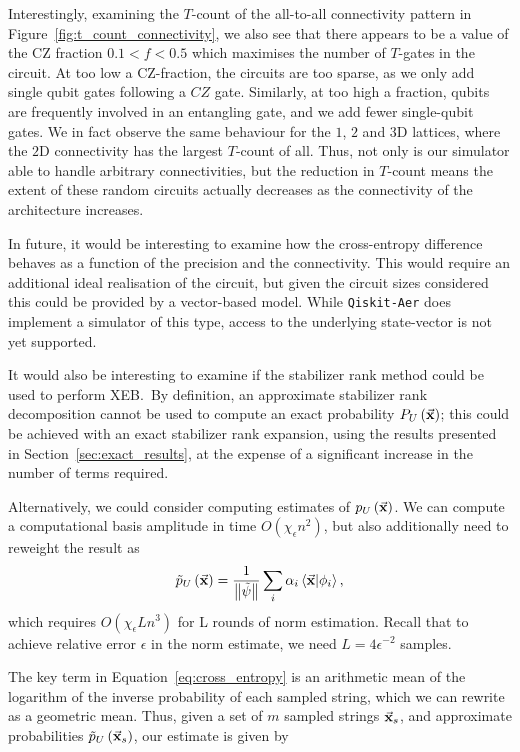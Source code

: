 Interestingly, examining the $T$-count of the all-to-all connectivity pattern in Figure~\ref{fig:t_count_connectivity}, we also see that there appears to be a value of the CZ fraction $0.1<f<0.5$ which maximises the number of $T$-gates in the circuit. At too low a CZ-fraction, the circuits are too sparse, as we only add single qubit gates following a $CZ$ gate. Similarly, at too high a fraction, qubits are frequently involved in an entangling gate, and we add fewer single-qubit gates. We in fact observe the same behaviour for the $1$, $2$ and $3$D lattices, where the $2$D connectivity has the largest $T$-count of all. Thus, not only is our simulator able to handle arbitrary connectivities, but the reduction in $T$-count means the extent of these random circuits actually decreases as the connectivity of the architecture increases.\par
In future, it would be interesting to examine how the cross-entropy difference behaves as a function of the precision and the connectivity. This would require an additional ideal realisation of the circuit, but given the circuit sizes considered this could be provided by a vector-based model. While \texttt{Qiskit-Aer} does implement a simulator of this type, access to the underlying state-vector is not yet supported.\par
It would also be interesting to examine if the stabilizer rank method could be used to perform XEB.\ By definition, an approximate stabilizer rank decomposition cannot be used to compute an exact probability $P_{U}\left(\va{x}\right)$; this could be achieved with an exact stabilizer rank expansion, using the results presented in Section~\ref{sec:exact_results}, at the expense of a significant increase in the number of terms required.\par
Alternatively, we could consider computing estimates of $p_{U}\left(\va{x}\right)$. We can compute a computational basis amplitude in time $O\left(\chi_{\epsilon} n^{2}\right)$, but also additionally need to reweight the result as
\[\tilde{p}_{U}\left(\va{x}\right)=\frac{1}{\norm{\tilde{\psi}}}\sum_{i}\alpha_{i}\braket{\va{x}}{\phi_{i}},\]
which requires $O\left(\chi_{\epsilon}Ln^{3}\right)$ for L rounds of norm estimation. Recall that to achieve relative error $\epsilon$ in the norm estimate, we need $L=4\epsilon^{-2}$ samples.\par
The key term in Equation~\ref{eq:cross_entropy} is an arithmetic mean of the logarithm of the inverse probability of each sampled string, which we can rewrite as a geometric mean. Thus, given a set of $m$ sampled strings $\va{x}_{s}$, and approximate probabilities $\tilde{p}_{U}\left(\va{x}_{s}\right)$, our estimate is given by
